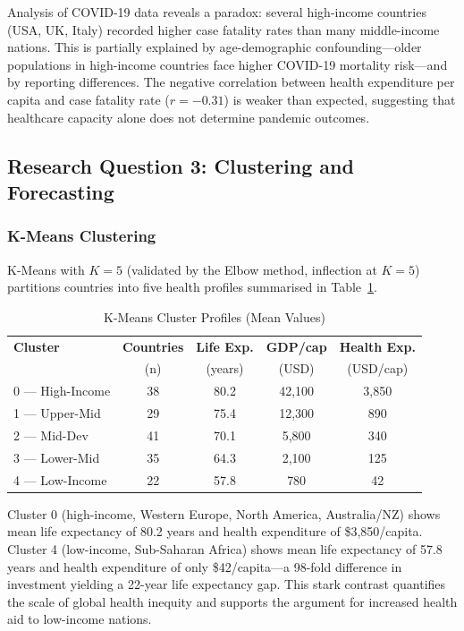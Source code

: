 \documentclass[conference]{IEEEtran}
\begin{document}
Analysis of COVID-19 data reveals a paradox: several high-income countries
(USA, UK, Italy) recorded higher case fatality rates than many middle-income
nations. This is partially explained by age-demographic confounding---older
populations in high-income countries face higher COVID-19 mortality risk---and
by reporting differences. The negative correlation between health expenditure
per capita and case fatality rate ($r = -0.31$) is weaker than expected,
suggesting that healthcare capacity alone does not determine pandemic outcomes.

\subsection{Research Question 3: Clustering and Forecasting}

\subsubsection{K-Means Clustering}
K-Means with $K=5$ (validated by the Elbow method, inflection at $K=5$)
partitions countries into five health profiles summarised in
Table~\ref{tab:clusters}.

\begin{table}[H]
\centering
\caption{K-Means Cluster Profiles (Mean Values)}
\label{tab:clusters}
\renewcommand{\arraystretch}{1.2}
\begin{tabular}{@{}lcccc@{}}
\toprule
\textbf{Cluster} & \textbf{Countries} & \textbf{Life Exp.} & \textbf{GDP/cap} & \textbf{Health Exp.} \\
 & (n) & (years) & (USD) & (USD/cap) \\
\midrule
0 — High-Income  & 38 & 80.2 & 42,100 & 3,850 \\
1 — Upper-Mid    & 29 & 75.4 & 12,300 & 890   \\
2 — Mid-Dev      & 41 & 70.1 & 5,800  & 340   \\
3 — Lower-Mid    & 35 & 64.3 & 2,100  & 125   \\
4 — Low-Income   & 22 & 57.8 & 780    & 42    \\
\bottomrule
\end{tabular}
\end{table}

Cluster 0 (high-income, Western Europe, North America, Australia/NZ) shows
mean life expectancy of 80.2 years and health expenditure of \$3,850/capita.
Cluster 4 (low-income, Sub-Saharan Africa) shows mean life expectancy of
57.8 years and health expenditure of only \$42/capita---a 98-fold difference
in investment yielding a 22-year life expectancy gap. This stark contrast
quantifies the scale of global health inequity and supports the argument for
increased health aid to low-income nations.
\end{document}
